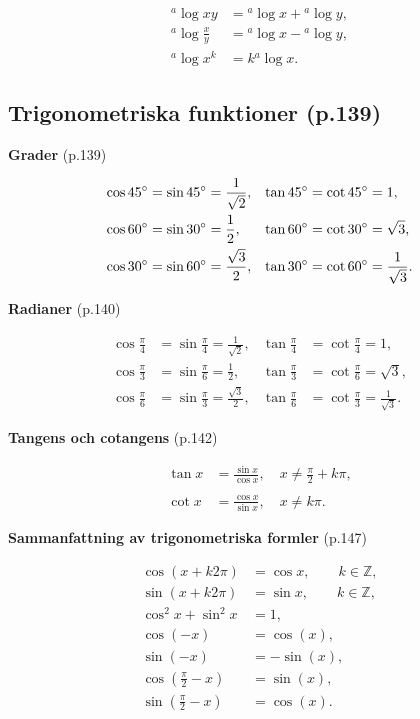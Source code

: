 \documentclass[11pt]{article}
\begin{document}
\begin{align}
    {}^a\log xy &= {}^a\log x + {}^a\log y,\\
    {}^a\log \frac{x}{y} &= {}^a\log x - {}^a\log y,\\
    {}^a\log x^k &= k{}^a\log x.
\end{align}

\subsection{Trigonometriska funktioner (p.139)}

\textbf{Grader} (p.139)

\begin{align}
    \cos 45\degree &= \sin 45\degree = \frac{1}{\sqrt{2}}, &\tan 45\degree &= \cot 45\degree = 1,\\
    \cos 60\degree &= \sin 30\degree = \frac{1}{2},        &\tan 60\degree &= \cot 30\degree = \sqrt{3},\\
    \cos 30\degree &= \sin 60\degree = \frac{\sqrt{3}}{2}, &\tan 30\degree &= \cot 60\degree = \frac{1}{\sqrt{3}}.
\end{align}

\textbf{Radianer} (p.140)

\begin{align}
    \cos \frac{\pi}{4} &= \sin \frac{\pi}{4} = \frac{1}{\sqrt{2}}, &\tan \frac{\pi}{4} &= \cot \frac{\pi}{4} = 1,\\
    \cos \frac{\pi}{3} &= \sin \frac{\pi}{6} = \frac{1}{2},        &\tan \frac{\pi}{3} &= \cot \frac{\pi}{6} = \sqrt{3},\\
    \cos \frac{\pi}{6} &= \sin \frac{\pi}{3} = \frac{\sqrt{3}}{2}, &\tan \frac{\pi}{6} &= \cot \frac{\pi}{3} = \frac{1}{\sqrt{3}}.
\end{align}

\textbf{Tangens och cotangens} (p.142)

\begin{align}
    \tan x &= \frac{\sin x}{\cos x}, \quad x \neq \frac{\pi}{2} + k\pi,\\
    \nonumber \\
    \cot x &= \frac{\cos x}{\sin x}, \quad x \neq k\pi.
\end{align}

\textbf{Sammanfattning av trigonometriska formler} (p.147)

\begin{align}
    \cos(x + k2\pi) &= \cos x, \qquad k \in \mathbb{Z},\\
    \sin(x + k2\pi) &= \sin x, \qquad k \in \mathbb{Z},\\
    \cos^2 x + \sin^2 x &= 1,\\
    \cos(-x) &= \cos(x),\\
    \sin(-x) &= -\sin(x),\\
    \cos\left(\frac{\pi}{2} - x\right) &= \sin(x),\\
    \sin\left(\frac{\pi}{2} - x\right) &= \cos(x).
\end{align}
\end{document}
